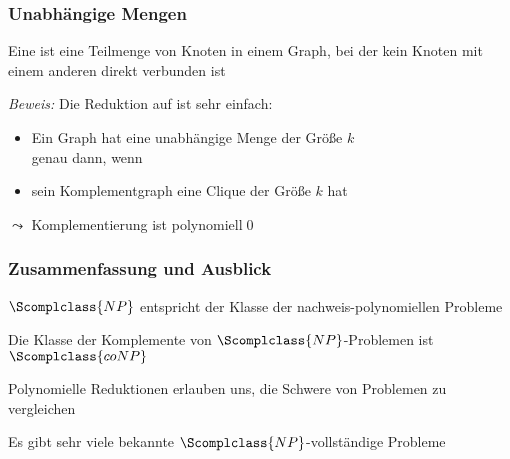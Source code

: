 \documentclass[aspectratio=1610,onlymath]{beamer}
\begin{document}
\begin{frame}\frametitle{Unabhängige Mengen}

Eine  ist eine Teilmenge von Knoten in einem Graph, bei der kein
Knoten mit einem anderen direkt verbunden ist\medskip

\medskip\pause

\pause

\emph{Beweis:} Die Reduktion auf  ist sehr einfach:
\begin{itemize}
\item Ein Graph hat eine unabhängige Menge der Größe $k$\\
genau dann, wenn
\item sein Komplementgraph eine Clique der Größe $k$ hat
\end{itemize}
$\leadsto$ Komplementierung ist polynomiell\qed

\end{frame}


\begin{frame}\frametitle{Zusammenfassung und Ausblick}

$\Scomplclass{NP}$ entspricht der Klasse der nachweis-polynomiellen Probleme
\bigskip

Die Klasse der Komplemente von $\Scomplclass{NP}$-Problemen ist $\Scomplclass{coNP}$\bigskip

Polynomielle Reduktionen erlauben uns, die Schwere von Problemen zu vergleichen
\bigskip

Es gibt sehr viele bekannte $\Scomplclass{NP}$-vollständige Probleme\bigskip


\end{frame}

% 
% 
% 
% 
% 
% 
\end{document}
